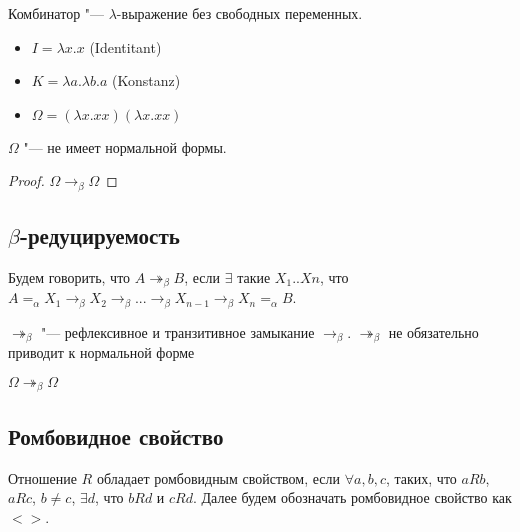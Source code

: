 \begin{definition}
	Комбинатор "--- $\lambda$-выражение без свободных переменных.
\end{definition}

\begin{definition} 
	\hfill
	\begin{itemize}
		\item $I=\lambda{}x.x$ (Identitant)
		\item $K=\lambda{}a.\lambda{}b.a$ (Konstanz)
		\item $\Omega = (\lambda{}x.xx)(\lambda{}x.xx)$
	\end{itemize}
\end{definition}

\begin{lemma}
	$\Omega$ "--- не имеет нормальной формы.
\end{lemma}

\begin{proof}
	$\Omega\to_{\beta}\Omega$
\end{proof}

\subsection{$\beta$-редуцируемость}

\begin{definition}
	Будем говорить, что $A\twoheadrightarrow_{\beta}B$, если $\exists$ такие $X_{1}..X{n}$, что $A=_{\alpha}X_{1}\to_{\beta}X_{2}\to_{\beta}...\to_{\beta}X_{n-1}\to_{\beta}X_{n}=_{\alpha}B$.
\end{definition}

$\twoheadrightarrow_{\beta}$ "--- рефлексивное и транзитивное замыкание $\to_{\beta}$. $\twoheadrightarrow_{\beta}$ не обязательно приводит к нормальной форме
\begin{example}
	$\Omega\twoheadrightarrow_{\beta}\Omega$
\end{example}

\subsection{Ромбовидное свойство}

\begin{definition}
	Отношение $R$ обладает ромбовидным свойством, если $\forall a,b,c$, таких, что $aRb$, $aRc$, $b\neq{}c$, $\exists{}d$, что $bRd$ и $cRd$. Далее будем обозначать ромбовидное свойство как $<>$.
\end{definition}

